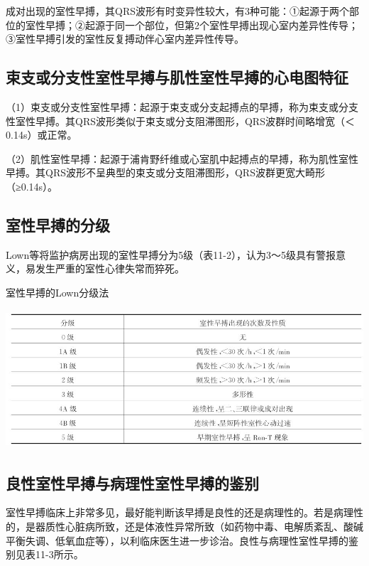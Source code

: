 成对出现的室性早搏，其QRS波形有时变异性较大，有3种可能：①起源于两个部位的室性早搏；②起源于同一个部位，但第2个室性早搏出现心室内差异性传导；③室性早搏引发的室性反复搏动伴心室内差异性传导。

\protect\hypertarget{text00018.htmlux5cux23subid159}{}{}

\subsection{束支或分支性室性早搏与肌性室性早搏的心电图特征}

（1）束支或分支性室性早搏：起源于束支或分支起搏点的早搏，称为束支或分支性室性早搏。其QRS波形类似于束支或分支阻滞图形，QRS波群时间略增宽（＜0.14s）或正常。

（2）肌性室性早搏：起源于浦肯野纤维或心室肌中起搏点的早搏，称为肌性室性早搏。其QRS波形不呈典型的束支或分支阻滞图形，QRS波群更宽大畸形（≥0.14s）。

\protect\hypertarget{text00018.htmlux5cux23subid160}{}{}

\subsection{室性早搏的分级}

Lown等将监护病房出现的室性早搏分为5级（表11-2），认为3～5级具有警报意义，易发生严重的室性心律失常而猝死。

\begin{table}[htbp]
\centering
\caption{室性早搏的Lown分级法}
\label{tab11-2}
\includegraphics[width=5.51042in,height=2.03125in]{./images/Image00190.jpg}
\end{table}

\protect\hypertarget{text00018.htmlux5cux23subid161}{}{}

\subsection{良性室性早搏与病理性室性早搏的鉴别}

室性早搏临床上非常多见，最好能判断该早搏是良性的还是病理性的。若是病理性的，是器质性心脏病所致，还是体液性异常所致（如药物中毒、电解质紊乱、酸碱平衡失调、低氧血症等），以利临床医生进一步诊治。良性与病理性室性早搏的鉴别见表11-3所示。

